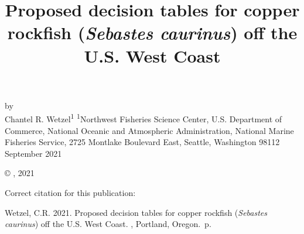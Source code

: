 \documentclass[11pt,
  english,
  a4paper,
]{article}
\date{}
\newcommand{\trTitle}{Proposed decision tables for copper rockfish (\emph{Sebastes caurinus}) off the U.S. West Coast}
\newcommand{\trYear}{2021}
\newcommand{\trMonth}{September}
\newcommand{\trAuthsBack}{Wetzel, C.R}
\newcommand{\trCitation}{
\begin{hangparas}{1em}{1}
\trAuthsBack{}. \trYear{}. \trTitle{}. \glsentrylong{pfmc}, Portland, Oregon. \pageref{LastPage}{}\,p.
\end{hangparas}}
\begin{document}

\renewcommand*{\thefootnote}{\fnsymbol{footnote}}

\small
\thispagestyle{empty}
\noindent
\begin{center}
\title{Proposed decision tables for copper rockfish (\emph{Sebastes caurinus}) off the U.S. West Coast}
\vspace{1.5cm}
{\Large\textbf{}}
\vfill
by\\
Chantel R. Wetzel\textsuperscript{1}\vfill
\textsuperscript{1}Northwest Fisheries Science Center, U.S. Department of Commerce, National Oceanic and Atmospheric Administration, National Marine Fisheries Service, 2725 Montlake Boulevard East, Seattle, Washington 98112\vfill
\trMonth{} \trYear{}
\end{center}
\clearpage

\thispagestyle{empty}
\vspace*{\fill}
\begin{center}
\copyright{} , \trYear{}\\
\end{center}
\par
\bigskip
\noindent
Correct citation for this publication:
\bigskip
\par
\trCitation{}
\clearpage


\tableofcontents\clearpage
\label{TRlastRoman}
\clearpage

\newpage
\thispagestyle{empty} %

\pagestyle{plain}  %
\renewcommand*{\thefootnote}{\arabic{footnote}}  %
\setcounter{footnote}{0}  %
\renewcommand{\headrulewidth}{0.5pt}
\renewcommand{\footrulewidth}{0.5pt}

\newcommand{\lt}{\ensuremath <}
\newcommand{\gt}{\ensuremath >}

\pagebreak
{}
\setcounter{page}{1}
\end{document}
